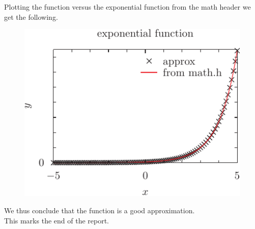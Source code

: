 \documentclass{article}
\begin{document}
%
Plotting the function versus the exponential function from the math header we get the following.
\begin{figure}%
	\includegraphics[width=1\textwidth]{pyxplot.pdf}
\end{figure}
We thus conclude that the function is a good approximation. \\
This marks the end of the report.
\end{document}
